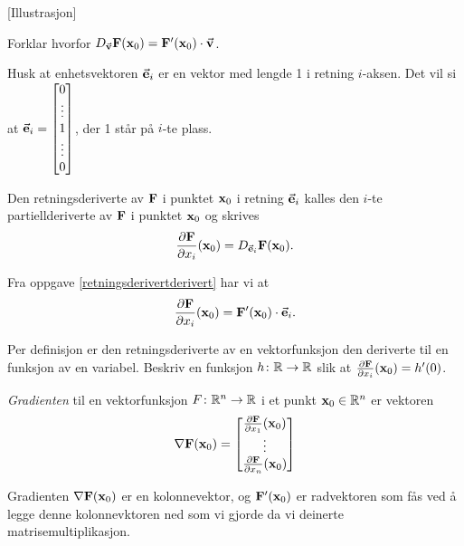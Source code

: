 [Illustrasjon]

\begin{oppgave}\label{retningsderivertderivert}
  Forklar hvorfor $D_{\vec{\mathbf{v}}} \mathbf{F}(\mathbf{x}_0) = \mathbf{F}'(\mathbf{x}_0)\cdot \vec{\mathbf{v}}$.
\end{oppgave}
  Husk at enhetsvektoren $\vec{\mathbf{e}}_i$ er en vektor med lengde 1 i retning $i$-aksen. Det vil
  si at $\vec{\mathbf{e}}_i = \begin{bmatrix} 0 \\ \vdots \\ 1 \\ \vdots \\ 0 \end{bmatrix}$, der 1
  står på $i$-te plass.
\begin{definisjon}
  Den retningsderiverte av $\mathbf{F}$ i punktet $\mathbf{x}_0$ i retning $\vec{\mathbf{e}}_i$
  kalles den $i$-te partiellderiverte av $\mathbf{F}$ i punktet $\mathbf{x}_0$ og skrives
  $$\frac{\partial \mathbf{F}}{\partial x_i}(\mathbf{x}_0) = D_{\vec{\mathbf{e}}_i} \mathbf{F}(\mathbf{x}_0).$$
\end{definisjon}
Fra oppgave \ref{retningsderivertderivert} har vi at
$$\frac{\partial \mathbf{F}}{\partial x_i}(\mathbf{x}_0) = \mathbf{F}'(\mathbf{x}_0)\cdot \vec{\mathbf{e}}_i.$$
\begin{oppgave}
  Per definisjon er den retningsderiverte av en vektorfunksjon den deriverte til en funksjon av en variabel. 
  Beskriv en funksjon $h \colon \mathbb{R} \to \mathbb{R}$ slik at $\frac{\partial \mathbf{F}}{\partial x_i}(\mathbf{x}_0) = h'(0)$.
\end{oppgave}
\begin{definisjon}
  {\em Gradienten} til en vektorfunksjon $F \colon \mathbb{R}^n \to \mathbb{R}$ i et punkt $\mathbf{x}_0 \in \mathbb{R}^n$ er vektoren
  $$\nabla \mathbf{F}(\mathbf{x}_0) = \begin{bmatrix}\frac{\partial \mathbf{F}}{\partial x_1}(\mathbf{x}_0) \\ \vdots \\ \frac{\partial \mathbf{F}}{\partial x_n}(\mathbf{x}_0)\end{bmatrix} $$
\end{definisjon}
\begin{bemerkning}
  Gradienten $\nabla \mathbf{F}(\mathbf{x}_0)$ er en kolonnevektor, og $\mathbf{F}'(\mathbf{x}_0)$ er
  radvektoren som fås ved å legge denne kolonnevktoren ned som vi gjorde da vi
  deinerte matrisemultiplikasjon.
\end{bemerkning}

